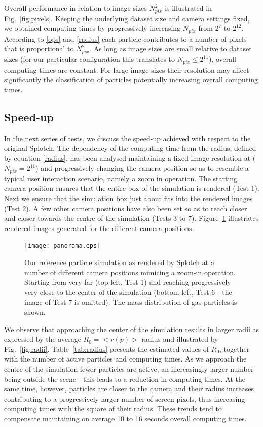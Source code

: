 \documentclass[smallextended]{svjour3}
\begin{document}
Overall performance in relation to image sizes $N_{pix}^2$ is illustrated in Fig.~\ref{fig:pixels}. Keeping the underlying dataset size and camera settings fixed, we obtained computing times by progressively increasing
$N_{pix}$ from ${2}^{7}$ to ${2}^{12}$. According to \eqref{ops} and \eqref{radius} each particle contributes to a number of pixels that is proportional to $N_{pix}^{2}$. As long as image sizes are small relative to dataset sizes (for our particular configuration this translates to $N_{pix} \le 2^{11}$), overall computing times are constant. For large image sizes their resolution may affect significantly the classification of particles potentially increasing overall computing times.
 
\subsection{Speed-up}
\label{sec:speed-up}
In the next series of tests, we discuss the speed-up achieved with respect to the original Splotch. 
The dependency of the computing time from the radius, defined by equation \eqref{radius}, has been analysed maintaining a fixed image resolution at ($N_{pix} = 2^{11}$) and progressively changing the camera position 
so as to resemble a typical user interaction scenario, namely a zoom in operation. 
The starting camera position ensures that the entire box of the simulation is rendered (Test 1). 
Next we ensure that the simulation box just about fits into the rendered images (Test 2). 
A few other camera positions have also been set so as to reach closer and closer towards the 
centre of the simulation (Tests 3 to 7). Figure~\ref{fig:panorama} illustrates rendered images generated for the different camera positions.

\begin{figure}
\texttt{[image: panorama.eps]}
\caption{Our reference particle simulation as rendered by Splotch at a number of different camera positions mimicing a zoom-in operation. Starting from very far (top-left, Test 1) and reaching progressively very close to the center of the simulation (bottom-left, Test 6 - the image of Test 7 is omitted). The mass distribution of gas particles is shown.}
\label{fig:panorama}
\end{figure}

We observe that approaching the center of the simulation results in larger radii 
as expressed by the average $R_0=<r(p)>$ radius and illustrated by Fig.~\ref{fig:radii}. 
Table~\ref{tab:radius} presents the estimated values of $R_0$, together with the number of active particles and computing times. As we approach the centre of the simulation fewer particles are active, an increasingly larger 
number being outside the scene - this leads to a reduction in computing times. At the same
time, however, particles are closer to the camera and their radius increases contributing to 
a progressively larger number of screen pixels,
thus increasing computing times with the square of their radius. 
These trends tend to compensate maintaining on average 10 to 16 seconds overall computing times.
\end{document}
